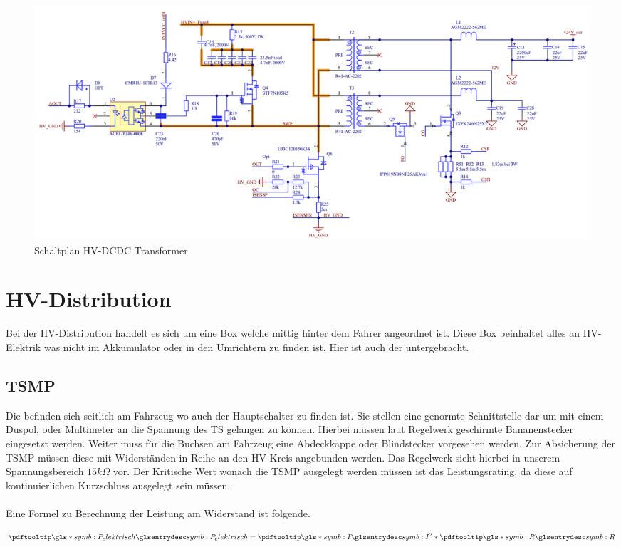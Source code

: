 \begin{figure}
	\centering
	\includegraphics[width=1\linewidth]{bilder/HVDCDC_Transformer_Schematic}
	\caption{Schaltplan \ac{HV}-DCDC Transformer}
	\label{fig:hvdcdctransformerschematic}
\end{figure}

\FloatBarrier
\section{\ac{HV}-Distribution}
Bei der \ac{HV}-Distribution handelt es sich um eine Box welche mittig hinter dem Fahrer angeordnet ist. Diese Box beinhaltet alles an \ac{HV}-Elektrik was nicht im Akkumulator oder in den Umrichtern zu finden ist. Hier ist auch der  untergebracht.

\FloatBarrier
\subsection{\ac{TSMP}}
Die  befinden sich seitlich am Fahrzeug wo auch der Hauptschalter zu finden ist. Sie stellen eine genormte Schnittstelle dar um mit einem Duspol, oder Multimeter an die Spannung des \ac{TS} gelangen zu können. Hierbei müssen laut Regelwerk \cite{FSRules} geschirmte Bananenstecker eingesetzt werden. Weiter muss für die Buchsen am Fahrzeug eine Abdeckkappe oder Blindstecker vorgesehen werden. Zur Absicherung der \ac{TSMP} müssen diese mit Widerständen in Reihe an den \ac{HV}-Kreis angebunden werden. Das Regelwerk sieht hierbei in unserem Spannungsbereich \ensuremath{15k\Omega} vor. Der Kritische Wert wonach die \ac{TSMP} ausgelegt werden müssen ist das Leistungsrating, da diese auf kontinuierlichen Kurzschluss ausgelegt sein müssen.
\\
\\
Eine Formel zu Berechnung der Leistung am Widerstand ist folgende.

\begin{equation}
	\label{eqn:Leistung am Wiederstand}
	\glsc{symb:P_elektrisch} = \glsc{symb:I}^{2} * \glsc{symb:R}
\end{equation}

